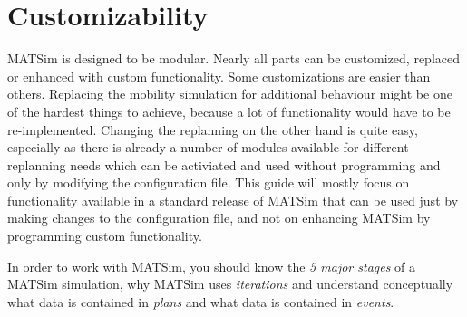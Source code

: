 \section{Customizability}
MATSim is designed to be modular. Nearly all parts can be customized, replaced
or enhanced with custom functionality. Some customizations are easier than
others. Replacing the mobility simulation for additional behaviour might be one
of the hardest things to achieve, because a lot of functionality would have to be re-implemented. Changing the replanning on the other hand is
quite easy, especially as there is already a number of modules available for
different replanning needs which can be activiated and used without programming
and only by modifying the configuration file. This guide will mostly focus on
functionality available in a standard release of MATSim that can be used just by
making changes to the configuration file, and not on enhancing MATSim by
programming custom functionality.


\begin{note}
In order to work with MATSim, you should know the \emph{5 major stages} of a
MATSim simulation, why MATSim uses \emph{iterations} and understand conceptually what
data is contained in \emph{plans} and what data is contained in \emph{events}.
\end{note}
